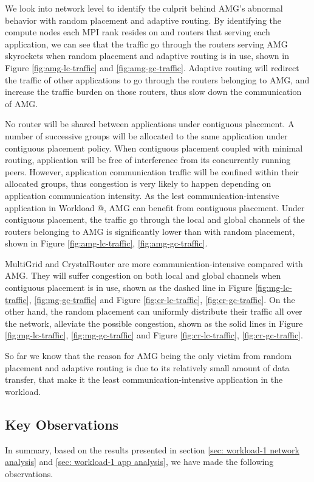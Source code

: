 \documentclass[conference,compsoc]{IEEEtran}
\makeatletter
\newcommand{\Rmnum}[1]{\expandafter\@slowromancap\romannumeral #1@}
\makeatother
\begin{document}
We look into network level to identify the culprit behind AMG's abnormal behavior with random placement and adaptive routing. By identifying the compute nodes each MPI rank resides on and routers that serving each application, we can see that the traffic go through the routers serving AMG skyrockets when random placement and adaptive routing is in use, shown in Figure \ref{fig:amg-lc-traffic} and \ref{fig:amg-gc-traffic}. Adaptive routing will redirect the traffic of other applications to go through the routers belonging to AMG, and increase the traffic burden on those routers, thus slow down the communication of AMG.

No router will be shared between applications under contiguous placement. A number of successive groups will be allocated to the same application under contiguous placement policy. When contiguous placement coupled with minimal routing, application will be free of interference from its concurrently running peers. However, application communication traffic will be confined within their allocated groups, thus congestion is very likely to happen depending on application communication intensity. As the lest communication-intensive application in Workload \Rmnum{1}, AMG can benefit from contiguous placement. Under contiguous placement, the traffic go through the local and global channels of the routers belonging to AMG is significantly lower than with random placement, shown in Figure \ref{fig:amg-lc-traffic}, \ref{fig:amg-gc-traffic}. 

MultiGrid and CrystalRouter are more communication-intensive compared with AMG. They will suffer congestion on both local and global channels when contiguous placement is in use, shown as the dashed line in Figure \ref{fig:mg-lc-traffic}, \ref{fig:mg-gc-traffic} and Figure \ref{fig:cr-lc-traffic}, \ref{fig:cr-gc-traffic}. On the other hand, the random placement can uniformly distribute their traffic all over the network, alleviate the possible congestion, shown as the solid lines in Figure \ref{fig:mg-lc-traffic}, \ref{fig:mg-gc-traffic} and Figure \ref{fig:cr-lc-traffic}, \ref{fig:cr-gc-traffic}.


So far we know that the reason for AMG being the only victim from random placement and adaptive routing is due to its relatively small amount of data transfer, that make it the least communication-intensive application in the workload.

\subsection{Key Observations}
In summary, based on the results presented in section \ref{sec: workload-1 network analysis} and \ref{sec: workload-1 app analysis}, we have made the following observations.
\end{document}
